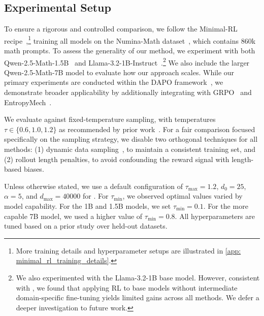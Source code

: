 \subsection{Experimental Setup}
\label{sec: experiment_setup}
To ensure a rigorous and controlled comparison, we follow the Minimal-RL recipe~\citep{xiong2025minimalist},\footnote{More training details and hyperparameter setups are illustrated in \cref{app: minimal_rl_training_details}. } training all models on the Numina-Math dataset~\citep{numina_math_7b}, which contains 860k math prompts. To assess the generality of our method, we experiment with both Qwen-2.5-Math-1.5B~\citep{yang2024qwen2} and Llama-3.2-1B-Instruct~\citep{dubey2024llama}.\footnote{We also experimented with the Llama-3.2-1B base model. However, consistent with \citet{wang2025octothinker}, we found that applying RL to base models without intermediate domain-specific fine-tuning yields limited gains across all methods. We defer a deeper investigation to future work.} We also include the larger Qwen-2.5-Math-7B model to evaluate how our approach scales. While our primary experiments are conducted within the DAPO framework~\citep{yu2025dapo}, we demonstrate broader applicability by additionally integrating \alg with GRPO~\citep{shao2024deepseekmath} and EntropyMech~\citep{cui2025entropy}.

We evaluate \alg against fixed-temperature sampling, with temperatures $\tau \in \{0.6, 1.0, 1.2\}$ as recommended by prior work~\citep{renze-2024-effect, guo2025deepseek, hou2025t1}. For a fair comparison focused specifically on the sampling strategy, we disable two orthogonal techniques for all methods: (1) dynamic data sampling~\citep{yu2025dapo}, to maintain a consistent training set, and (2) rollout length penalties, to avoid confounding the reward signal with length-based biases.

Unless otherwise stated, we use a default configuration of $\tau_{\max}=1.2$, $d_0=25$, $\alpha = 5$, and $d_{\max}=40000$ for \alg. 
%
For $\tau_{\min}$, we observed optimal values varied by model capability.
%
For the 1B and 1.5B models, we set $\tau_{\min}=0.1$. 
%
For the more capable 7B model, we used a higher value of $\tau_{\min}=0.8$.
%
All hyperparameters are tuned based on a prior study over held-out datasets. 
%


